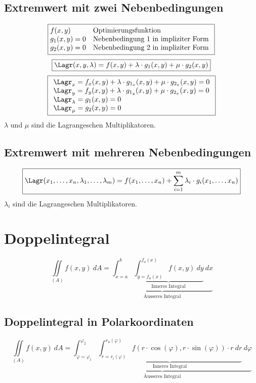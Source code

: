 \subsection{Extremwert mit zwei Nebenbedingungen}
\[ \boxed{\begin{array}{@{}ll}
f(x,y) & \text{Optimierungsfunktion} \\
g_1(x,y) = 0 & \text{Nebenbedingung 1 in impliziter Form} \\
g_2(x,y) = 0 & \text{Nebenbedingung 2 in impliziter Form} \\
\end{array}} \]
\[ \boxed{\Lagr(x,y,\lambda) = f(x,y) + \lambda \cdot g_1(x,y) + \mu \cdot g_2(x,y)} \]
\[ \boxed{\begin{array}{l}
\Lagr_x = f_x(x,y) + \lambda \cdot g_{1_x}(x,y) + \mu \cdot g_{2_x}(x,y) = 0 \\
\Lagr_y = f_y(x,y) + \lambda \cdot g_{1_y}(x,y) + \mu \cdot g_{2_x}(x,y) = 0 \\
\Lagr_\lambda = g_1(x,y) = 0 \\
\Lagr_\mu = g_2(x,y) = 0 \\
\end{array}} \]
$\lambda$ und $\mu$ sind die Lagrangeschen Multiplikatoren. 

\subsection{Extremwert mit mehreren Nebenbedingungen}
\[ \boxed{\Lagr(x_1, \dots, x_n, \lambda_1, \dots, \lambda_m) 
= f(x_1, \dots, x_n) 
+ \sum_{i=1}^{m} \lambda_i \cdot g_i(x_1, \dots, x_n)} \]
$\lambda_i$ sind die Lagrangeschen Multiplikatoren. 

\section{Doppelintegral}
\[ \boxed{\iint\limits_{(A)} f(x,y) ~ dA 
= \underbrace{\int_{x=a}^{b} 
\underbrace{\int_{y=f_u(x)}^{f_o(x)} f(x,y) ~ dy}
_{\text{Inneres Integral}} ~ dx}
_{\text{Äusseres Integral}}} \]

\subsection{Doppelintegral in Polarkoordinaten}
\[ \boxed{\iint\limits_{(A)} f(x,y) ~ dA 
= \underbrace{\int_{\varphi=\varphi_1}^{\varphi_2} 
\underbrace{\int_{r=r_i(\varphi)}^{r_a(\varphi)} f(r \cdot \cos(\varphi), 
r \cdot \sin(\varphi)) \cdot r ~ dr}
_{\text{Inneres Integral}} ~ d\varphi}
_{\text{Äusseres Integral}}} \]

